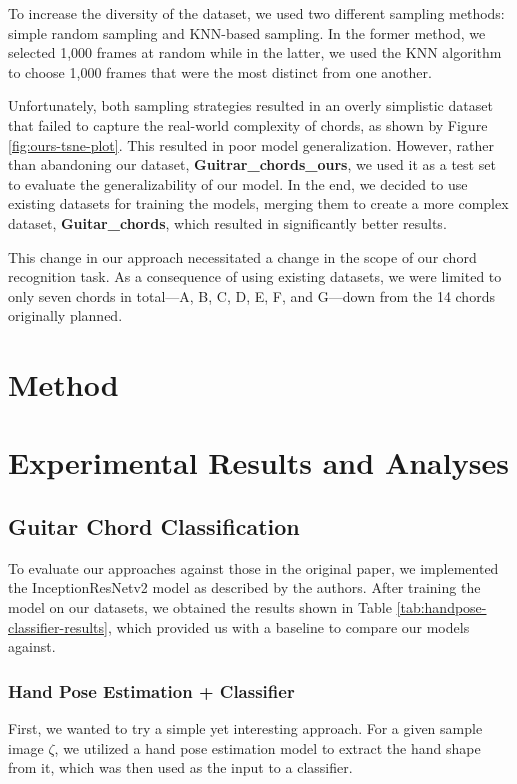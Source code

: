 \documentclass[10pt,twocolumn,letterpaper]{article}
\begin{document}
To increase the diversity of the dataset, we used two different sampling methods: simple random sampling and KNN-based sampling. In the former method, we selected 1,000 frames at random while in the latter, we used the KNN algorithm to choose 1,000 frames that were the most distinct from one another.

Unfortunately, both sampling strategies resulted in an overly simplistic dataset that failed to capture the real-world complexity of chords, as shown by Figure \ref{fig:ours-tsne-plot}. This resulted in poor model generalization. However, rather than abandoning our dataset, \textbf{Guitrar\_chords\_ours}, we used it as a test set to evaluate the generalizability of our model. In the end, we decided to use existing datasets \cite{guitar-chord-tvon8_dataset,guitar-chord-bounding-box_dataset, guitar-chord-handshape_dataset, guitar-chords-daewp_dataset} for training the models, merging them to create a more complex dataset, \textbf{Guitar\_chords}, which resulted in significantly better results.

This change in our approach necessitated a change in the scope of our chord recognition task. As a consequence of using existing datasets, we were limited to only seven chords in total—A, B, C, D, E, F, and G—down from the 14 chords originally planned.

\section{Method}

\section{Experimental Results and Analyses}
\label{sec:results}

\subsection{Guitar Chord Classification}
To evaluate our approaches against those in the original paper, we implemented the InceptionResNetv2 model as described by the authors. After training the model on our datasets, we obtained the results shown in Table \ref{tab:handpose-classifier-results}, which provided us with a baseline to compare our models against.

\subsubsection{Hand Pose Estimation + Classifier}
First, we wanted to try a simple yet interesting approach. For a given sample image $\zeta$, we utilized a hand pose estimation model to extract the hand shape from it, which was then used as the input to a classifier.
\end{document}
